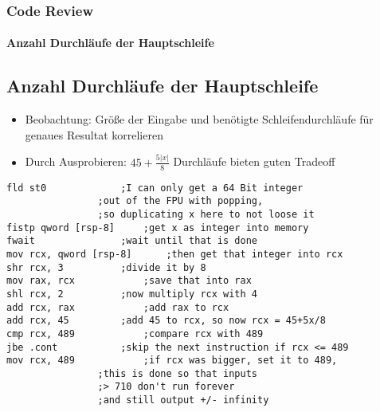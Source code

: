 \begin{frame}[fragile]
\frametitle{Code Review}
\framesubtitle{Anzahl Durchläufe der Hauptschleife}
\subsection{Anzahl Durchläufe der Hauptschleife}
\begin{itemize}
	\item Beobachtung: Größe der Eingabe und benötigte Schleifendurchläufe für genaues Resultat korrelieren
	\item Durch Ausprobieren: $45 + \frac{5|x|}{8}$ Durchläufe bieten guten Tradeoff
\end{itemize}
\begin{lstlisting}[style=myAssembly, title=sinh.asm Bestimmung Anzahl Schleifendurchläufe, firstnumber = 37]
fld st0				;I can only get a 64 Bit integer 
				;out of the FPU with popping,
				;so duplicating x here to not loose it
fistp qword [rsp-8]		;get x as integer into memory
fwait				;wait until that is done
mov rcx, qword [rsp-8]		;then get that integer into rcx
shr rcx, 3			;divide it by 8
mov rax, rcx			;save that into rax
shl rcx, 2			;now multiply rcx with 4
add rcx, rax			;add rax to rcx
add rcx, 45			;add 45 to rcx, so now rcx = 45+5x/8
cmp rcx, 489			;compare rcx with 489
jbe .cont			;skip the next instruction if rcx <= 489
mov rcx, 489			;if rcx was bigger, set it to 489, 
				;this is done so that inputs 
				;> 710 don't run forever 
				;and still output +/- infinity
\end{lstlisting}
\end{frame}
